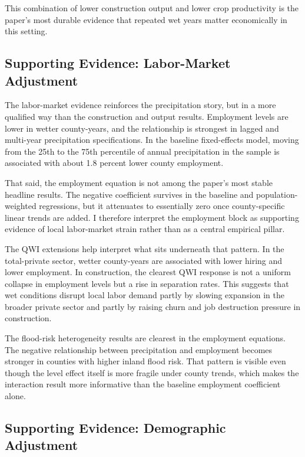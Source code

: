 \documentclass[12pt]{article}
\begin{document}
This combination of lower construction output and lower crop productivity is the paper's most durable evidence that repeated wet years matter economically in this setting.

\subsection{Supporting Evidence: Labor-Market Adjustment}

The labor-market evidence reinforces the precipitation story, but in a more qualified way than the construction and output results. Employment levels are lower in wetter county-years, and the relationship is strongest in lagged and multi-year precipitation specifications. In the baseline fixed-effects model, moving from the 25th to the 75th percentile of annual precipitation in the sample is associated with about 1.8 percent lower county employment.

That said, the employment equation is not among the paper's most stable headline results. The negative coefficient survives in the baseline and population-weighted regressions, but it attenuates to essentially zero once county-specific linear trends are added. I therefore interpret the employment block as supporting evidence of local labor-market strain rather than as a central empirical pillar.

The QWI extensions help interpret what sits underneath that pattern. In the total-private sector, wetter county-years are associated with lower hiring and lower employment. In construction, the clearest QWI response is not a uniform collapse in employment levels but a rise in separation rates. This suggests that wet conditions disrupt local labor demand partly by slowing expansion in the broader private sector and partly by raising churn and job destruction pressure in construction.

The flood-risk heterogeneity results are clearest in the employment equations. The negative relationship between precipitation and employment becomes stronger in counties with higher inland flood risk. That pattern is visible even though the level effect itself is more fragile under county trends, which makes the interaction result more informative than the baseline employment coefficient alone.

\subsection{Supporting Evidence: Demographic Adjustment}
\end{document}
